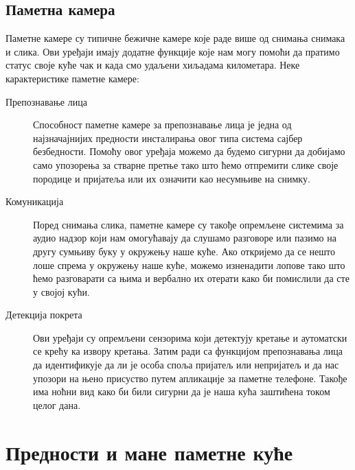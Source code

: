 \documentclass[a4paper]{article}
\begin{document}
\subsection{Паметна камера}
Паметне камере су типичне бежичне камере које раде више од снимања снимака и слика.
Ови уређаји имају додатне функције које нам могу помоћи да пратимо статус своје куће чак и када смо удаљени хиљадама километара.
\newline\newline Неке карактеристике паметне камере:
\begin{description}
    \item[Препознавање лица]
    Способност паметне камере за препознавање лица је једна од најзначајнијих предности инсталирања овог типа система сајбер безбедности.
    Помоћу овог уређаја можемо да будемо сигурни да добијамо само упозорења за стварне претње тако што ћемо отпремити слике своје породице
    и пријатеља или их означити као несумњиве на снимку.
    \item[Комуникација]
    Поред снимања слика, паметне камере су такође опремљене системима за аудио надзор који нам омогућавају да слушамо разговоре или
    пазимо на другу сумњиву буку у окружењу наше куће. Ако откријемо да се нешто лоше спрема у окружењу наше куће, можемо изненадити лопове
    тако што ћемо разговарати са њима и вербално их отерати како би помислили да сте у својој кући.
    \item[Детекција покрета]
    Ови уређаји су опремљени сензорима који детектују кретање и аутоматски се крећу ка извору кретања. Затим ради са функцијом препознавања лица да
    идентификује да ли је особа споља пријатељ или непријатељ и да нас упозори на њено присуство путем апликације за паметне телефоне.
    Такође има ноћни вид како би били сигурни да је наша кућа заштићена током целог дана.
\end{description}

\section{Предности и мане паметне куће}
\end{document}
